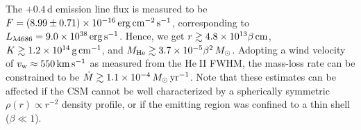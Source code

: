 \documentclass[twocolumn]{aastex63}
\def\ion#1#2{#1$\;${\footnotesize\rm{#2}}\relax}
\begin{document}
\begin{CJK*}{UTF8}{gbsn}
The $+0.4$\,d emission line flux is measured to be $F = (8.99\pm 0.71)\times10^{-16}\,{\rm erg\, 
	cm^{-2}\,s^{-1}}$, corresponding to $L_{\lambda 4686} = 9.0\times 10^{38}\,{\rm erg\, s^{-1}}$. 
	Hence, 
we get $r \gtrsim 4.8 \times 10^{13} \beta \,{\rm cm}$, $K \gtrsim 1.2\times 10^{14} \, {\rm 
	g\,cm^{-1}}$, and $M_{\rm He} \gtrsim 3.7\times 10^{-5} \beta^2\, M_{\odot}$. Adopting a wind 
	velocity of $v_{\rm w} \approx 550 \, {\rm km\, s^{-1}}$ as measured from the \ion{He}{II} FWHM, 
	the mass-loss rate can be constrained to be $\dot M \gtrsim 1.1\times 10^{-4}\,{M_\odot\, \rm 
	yr^{-1}}$. Note that these 
	estimates can be affected if the CSM cannot be well characterized by a spherically 
	symmetric $\rho(r) \propto r^{-2}$ density profile, or if the emitting region was confined to a thin 
	shell ($\beta \ll 1$).
	

\end{CJK*}
\end{document}
